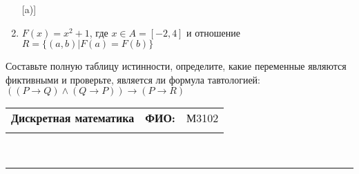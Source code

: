 \documentclass[10pt]{exam}
\newcommand{\class}{Дискретная математика}
\newcommand{\examdate}{}
\begin{document}
\begin{questions}
\begin{enumerate} [a)]
\item $F(x)=x^{2}+1$, где $x \in A = [-2, 4]$ и отношение $R = \{(a,b)|F(a) = F(b)\}$
\end{enumerate}\question Составьте полную таблицу истинности, определите, какие переменные являются фиктивными и проверьте, является ли формула тавтологией:
$(( P \rightarrow Q) \land (Q \rightarrow P)) \rightarrow (P \rightarrow R)$

\end{questions}
\newpage
\begin{flushright}
\begin{tabular}{p{2.8in} r l}
\textbf{\class} & \textbf{ФИО:} &М3102
\\

\textbf{\examdate} &&\\
\end{tabular}\\
\end{flushright}
\rule[1ex]{\textwidth}{.1pt}
\end{document}
